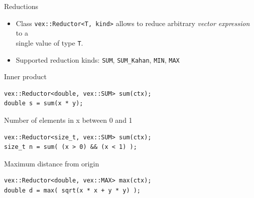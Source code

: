 \documentclass[@BEAMER_OPTIONS@]{beamer}
\newcommand{\code}[1]{\lstinline|#1|}
\begin{document}
\begin{frame}[fragile]{Reductions}
    \begin{itemize}
        \item Class \code{vex::Reductor<T, kind>} allows to reduce arbitrary
            \emph{vector expression} to a\\ single value of type \code{T}.
        \item Supported reduction kinds: \code{SUM}, \code{SUM_Kahan},
            \code{MIN}, \code{MAX}
    \end{itemize}
    \begin{exampleblock}{Inner product}
        \begin{lstlisting}
vex::Reductor<double, vex::SUM> sum(ctx);
double s = sum(x * y);
        \end{lstlisting}
    \end{exampleblock}
    \begin{exampleblock}{Number of elements in x between 0 and 1}
        \begin{lstlisting}
vex::Reductor<size_t, vex::SUM> sum(ctx);
size_t n = sum( (x > 0) && (x < 1) );
        \end{lstlisting}
    \end{exampleblock}
    \begin{exampleblock}{Maximum distance from origin}
        \begin{lstlisting}
vex::Reductor<double, vex::MAX> max(ctx);
double d = max( sqrt(x * x + y * y) );
        \end{lstlisting}
    \end{exampleblock}
\end{frame}

\end{document}
